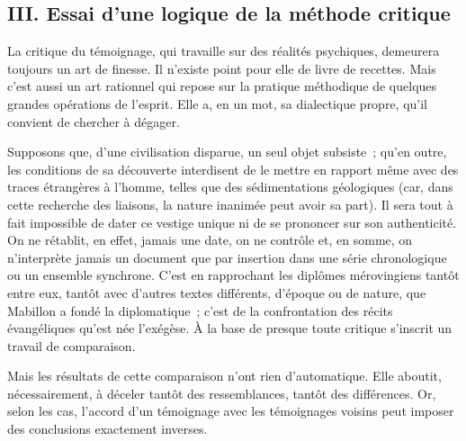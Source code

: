 \documentclass[french,twoside]{book} %
\newcommand{\astermono}{\medskip\centerline{\color{rubric}\large\selectfont{\syms ✻}}\medskip\par}%
\begin{document}
\subsection[{III. Essai d’une logique de la méthode critique}]{III. Essai d’une logique de la méthode critique}
\noindent La critique du témoignage, qui travaille sur des réalités psychiques, demeurera toujours un art de finesse. Il n’existe point pour elle de livre de recettes. Mais c’est aussi un art rationnel qui repose sur la pratique méthodique de quelques grandes opérations de l’esprit. Elle a, en un mot, sa dialectique propre, qu’il convient de chercher à dégager.\par

\astermono

\noindent Supposons que, d’une civilisation disparue, un seul objet subsiste ; qu’en outre, les conditions de sa découverte interdisent de le mettre en rapport même avec des traces étrangères à l’homme, telles que des sédi­mentations géologiques (car, dans cette recherche des liaisons, la nature inanimée peut avoir sa part). Il sera tout à fait impossible de dater ce vestige unique ni de se prononcer sur son authenticité. On ne rétablit, en effet, jamais une date, on ne contrôle et, en somme, on n’interprète jamais un document que par insertion dans une série chronologique ou un ensemble synchrone. C’est en rapprochant les diplômes mérovingiens tantôt entre eux, tantôt avec d’autres textes différents, d’époque ou de nature, que Mabillon a fondé la diplomatique ; c’est de la confrontation des récits évangéliques qu’est née l’exégèse. À la base de presque toute critique s’inscrit un travail de comparaison.\par
Mais les résultats de cette comparaison n’ont rien d’automatique. Elle aboutit, nécessairement, à déceler tantôt des ressemblances, tantôt des différences. Or, selon les cas, l’accord d’un témoignage avec les témoi­gnages voisins peut imposer des conclusions exactement inverses.\par

\astermono
\end{document}
